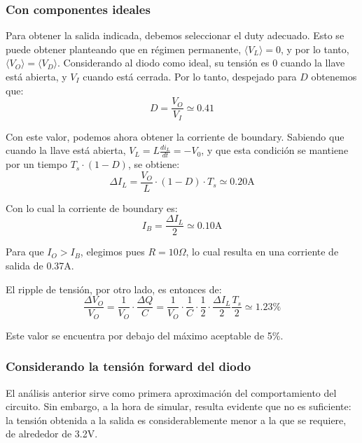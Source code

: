 \documentclass[e4_tp1_main.tex]{subfiles}
\begin{document}
\subsubsection{Con componentes ideales}

Para obtener la salida indicada, debemos seleccionar el duty adecuado. Esto se puede obtener planteando que en r\'egimen permanente, $\langle V_L \rangle = 0$, y por lo tanto, $\langle V_O \rangle = \langle V_D \rangle$. Considerando al diodo como ideal, su tensi\'on es 0 cuando la llave est\'a abierta, y $V_I$ cuando est\'a cerrada. Por lo tanto, despejado para $D$ obtenemos que:
\begin{equation}
	D = \frac{V_O}{V_I} \simeq 0.41
\end{equation}  

Con este valor, podemos ahora obtener la corriente de boundary. Sabiendo que cuando la llave est\'a abierta, $V_L = L \frac{di_L}{dt} = -V_0$, y que esta condici\'on se mantiene por un tiempo $T_s \cdot (1-D)$, se obtiene:
\begin{equation}
	\Delta I_L = \frac{V_O}{L} \cdot (1-D) \cdot T_s \simeq 0.20\text{A}
\end{equation} 

Con lo cual la corriente de boundary es:
\begin{equation}
	I_{B} = \frac{\Delta I_L}{2} \simeq 0.10\text{A}
\end{equation}

Para que $I_O > I_B$, elegimos pues $R = 10\Omega$, lo cual resulta en una corriente de salida de 0.37A.

El ripple de tensi\'on, por otro lado, es entonces de:
\begin{equation}
	\frac{\Delta V_O}{V_O} 
	= \frac{1}{V_O} \cdot \frac{\Delta Q}{C} 
	= \frac{1}{V_O} 
	\cdot \frac{1}{C} \cdot \frac{1}{2} \cdot \frac{\Delta I_L}{2} \frac{T_s}{2}
	\simeq 1.23 \%
\end{equation}

Este valor se encuentra por debajo del m\'aximo aceptable de 5\%.


\subsubsection{Considerando la tensi\'on forward del diodo}

El an\'alisis anterior sirve como primera aproximaci\'on del comportamiento del circuito. Sin embargo, a la hora de simular, resulta evidente que no es suficiente: la tensi\'on obtenida a la salida es considerablemente menor a la que se requiere, de alrededor de 3.2V.
\end{document}
